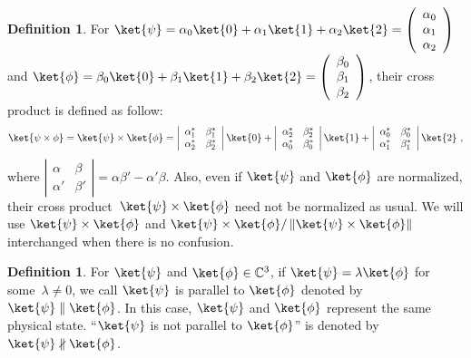 \documentclass[12pt]{iopart}
\theoremstyle{plain}
\theoremstyle{definition}
\newtheorem{definition}[thm]{Definition}
\theoremstyle{remark}
\begin{document}
\begin{definition}\label{def:cross-product}For $\ket{\psi}=\alpha_{0}\ket{0}+\alpha_{1}\ket{1}+\alpha_{2}\ket{2}=\left(\begin{array}{c}
\alpha_{0}\\
\alpha_{1}\\
\alpha_{2}
\end{array}\right)$ and $\ket{\phi}=\beta_{0}\ket{0}+\beta_{1}\ket{1}+\beta_{2}\ket{2}=\left(\begin{array}{c}
\beta_{0}\\
\beta_{1}\\
\beta_{2}
\end{array}\right)$, their cross product is defined as follow: 
\begin{equation}
\ket{\psi\times\phi}=\ket{\psi}\times\ket{\phi}=\left|\begin{array}{cc}
\alpha_{1}^{*} & \beta_{1}^{*}\\
\alpha_{2}^{*} & \beta_{2}^{*}
\end{array}\right|\ket{0}+\left|\begin{array}{cc}
\alpha_{2}^{*} & \beta_{2}^{*}\\
\alpha_{0}^{*} & \beta_{0}^{*}
\end{array}\right|\ket{1}+\left|\begin{array}{cc}
\alpha_{0}^{*} & \beta_{0}^{*}\\
\alpha_{1}^{*} & \beta_{1}^{*}
\end{array}\right|\ket{2}\textrm{ ,}
\end{equation}
where $\left|\begin{array}{cc}
\alpha & \beta\\
\alpha' & \beta'
\end{array}\right|=\alpha\beta'-\alpha'\beta$. Also, even if $\ket{\psi}$ and $\ket{\phi}$ are normalized, their
cross product~$\ket{\psi}\times\ket{\phi}$ need not be normalized
as usual. We will use $\ket{\psi}\times\ket{\phi}$ and $\ket{\psi}\times\ket{\phi}/\left\Vert \ket{\psi}\times\ket{\phi}\right\Vert $
interchanged when there is no confusion.\end{definition}

\begin{definition}For $\ket{\psi}$ and $\ket{\phi}\in\mathbb{C}^{3}$,
if $\ket{\psi}=\lambda\ket{\phi}$ for some~$\lambda\ne0$, we call
$\ket{\psi}$ is parallel to $\ket{\phi}$ denoted by $\ket{\psi}\parallel\ket{\phi}$.
In this case, $\ket{\psi}$ and $\ket{\phi}$ represent the same physical
state. ``$\ket{\psi}$ is not parallel to $\ket{\phi}$'' is denoted
by $\ket{\psi}\nparallel\ket{\phi}$.\end{definition}
\end{document}
